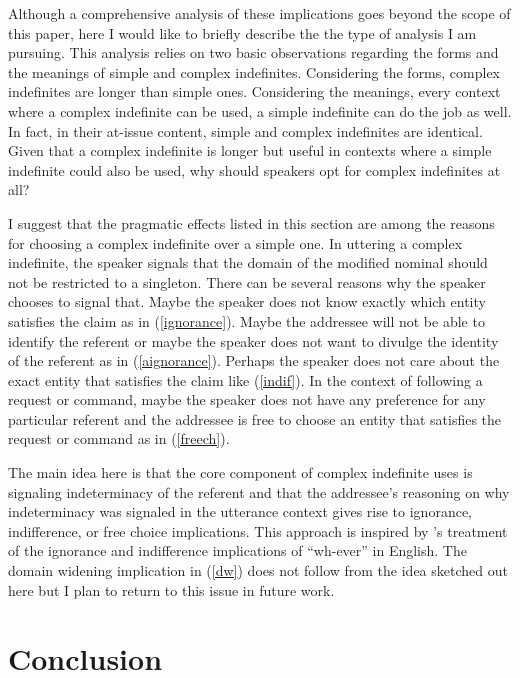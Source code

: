 \documentclass{salt}
\begin{document}
Although a comprehensive analysis of these implications goes beyond the scope of this paper, here I would like to briefly describe the the type of analysis I am pursuing. This analysis relies on two basic observations regarding the forms and the meanings of simple and complex indefinites. Considering the forms, complex indefinites are longer than simple ones. Considering the meanings, every context where a complex indefinite can be used, a simple indefinite can do the job as well. In fact, in their at-issue content, simple and complex indefinites are identical. Given that a complex indefinite is longer but useful in contexts where a simple indefinite could also be used, why should speakers opt for complex indefinites at all?

I suggest that the pragmatic effects listed in this section are among the reasons for choosing a complex indefinite over a simple one. In uttering a complex indefinite, the speaker signals that the domain of the modified nominal should not be restricted to a singleton. There can be several reasons why the speaker chooses to signal that. Maybe the speaker does not know exactly which entity satisfies the claim as in (\ref{ignorance}). Maybe the addressee will not be able to identify the referent or maybe the speaker does not want to divulge the identity of the referent as in (\ref{aignorance}). Perhaps the speaker does not care about the exact entity that satisfies the claim like (\ref{indif}). In the context of following a request or command, maybe the speaker does not have any preference for any particular referent and the addressee is free to choose an entity that satisfies the request or command as in (\ref{freech}). 

The main idea here is that the core component of complex indefinite uses is signaling indeterminacy of the referent and that the addressee's reasoning on why indeterminacy was signaled in the utterance context gives rise to ignorance, indifference, or free choice implications. This approach is inspired by \cite{condoravdi2015}'s treatment of the ignorance and indifference implications of ``wh-ever'' in English. The domain widening implication in (\ref{dw}) does not follow from the idea sketched out here but I plan to return to this issue in future work.

\section {Conclusion}
\end{document}
